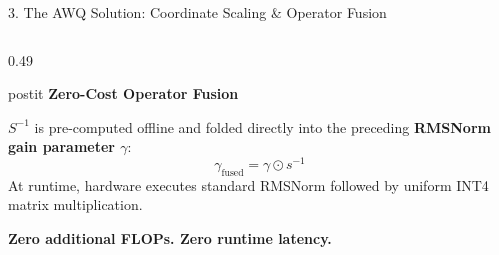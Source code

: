 \documentclass[aspectratio=169, 10pt]{beamer}
\begin{document}
\begin{frame}{3. The AWQ Solution: Coordinate Scaling \& Operator Fusion}
\begin{columns}[T]
\begin{column}{0.49\textwidth}
      \vspace{0.06cm}
      \begin{beamercolorbox}[rounded=true, shadow=false, wd=\linewidth]{postit}
        \centering
        \textbf{Zero-Cost Operator Fusion}\par
        \vspace{0.05cm}
        \scriptsize
        $S^{-1}$ is pre-computed offline and folded directly into the preceding \textbf{RMSNorm gain parameter $\gamma$}:
        \[
          \gamma_{\text{fused}} = \gamma \odot s^{-1}
        \]
        At runtime, hardware executes standard RMSNorm followed by uniform INT4 matrix multiplication.\par
        \textbf{Zero additional FLOPs. Zero runtime latency.}
      \end{beamercolorbox}
    \end{column}
  \end{columns}
\end{frame}
\end{document}
